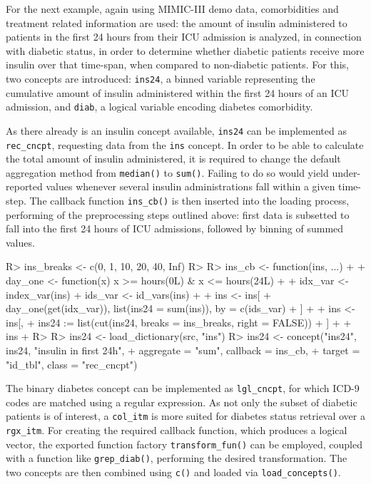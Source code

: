 \documentclass[
  notitle,
  nojss,
  noheadings]{jss}
\begin{document}
For the next example, again using MIMIC-III demo data, comorbidities and
treatment related information are used: the amount of insulin
administered to patients in the first 24 hours from their ICU admission
is analyzed, in connection with diabetic status, in order to determine
whether diabetic patients receive more insulin over that time-span, when
compared to non-diabetic patients. For this, two concepts are
introduced: \texttt{ins24}, a binned variable representing the
cumulative amount of insulin administered within the first 24 hours of
an ICU admission, and \texttt{diab}, a logical variable encoding
diabetes comorbidity.

As there already is an insulin concept available, \texttt{ins24} can be
implemented as \texttt{rec\_cncpt}, requesting data from the
\texttt{ins} concept. In order to be able to calculate the total amount
of insulin administered, it is required to change the default
aggregation method from \texttt{median()} to \texttt{sum()}. Failing to
do so would yield under-reported values whenever several insulin
administrations fall within a given time-step. The callback function
\texttt{ins\_cb()} is then inserted into the loading process, performing
of the preprocessing steps outlined above: first data is subsetted to
fall into the first 24 hours of ICU admissions, followed by binning of
summed values.

\begin{CodeChunk}
\begin{CodeInput}
R> ins_breaks <- c(0, 1, 10, 20, 40, Inf)
R> 
R> ins_cb <- function(ins, ...) {
+ 
+   day_one <- function(x) x >= hours(0L) & x <= hours(24L)
+ 
+   idx_var <- index_var(ins)
+   ids_var <- id_vars(ins)
+ 
+   ins <- ins[
+     day_one(get(idx_var)), list(ins24 = sum(ins)), by = c(ids_var)
+   ]
+ 
+   ins <- ins[,
+     ins24 := list(cut(ins24, breaks = ins_breaks, right = FALSE))
+   ]
+ 
+   ins
+ }
R> 
R> ins24 <- load_dictionary(src, "ins")
R> ins24 <- concept("ins24", ins24, "insulin in first 24h",
+                  aggregate = "sum", callback = ins_cb,
+                  target = "id_tbl", class = "rec_cncpt")
\end{CodeInput}
\end{CodeChunk}

The binary diabetes concept can be implemented as \texttt{lgl\_cncpt},
for which ICD-9 codes are matched using a regular expression. As not
only the subset of diabetic patients is of interest, a \texttt{col\_itm}
is more suited for diabetes status retrieval over a \texttt{rgx\_itm}.
For creating the required callback function, which produces a logical
vector, the exported function factory \texttt{transform\_fun()} can be
employed, coupled with a function like \texttt{grep\_diab()}, performing
the desired transformation. The two concepts are then combined using
\texttt{c()} and loaded via \texttt{load\_concepts()}.
\end{document}
